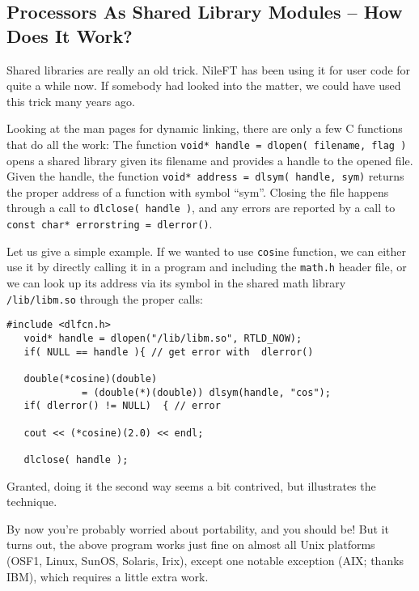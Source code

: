 \documentclass[12pt]{article}
\begin{document}
\begin{appendix}

\section{Processors As Shared Library Modules -- How Does It Work?
  }
\label{sec:SharedProcessors}

Shared libraries are really an old trick. NileFT has been using it for
user code for quite a while now. If somebody had looked into the matter,
we could have used this trick many years ago.

Looking at the man pages for dynamic linking, there are only a few C
functions that do all the work:
The function \texttt{void* handle = dlopen( filename, flag )} opens a
shared library given its filename and provides a handle to the opened file. 
Given the handle, the function \texttt{void* address = dlsym( handle,
sym)} returns the proper address of a function with symbol ``sym''.
Closing the file happens through a call to \texttt{dlclose( handle )},
and any errors are reported by a call to \texttt{const char* errorstring
= dlerror()}.

Let us give a simple example. If we wanted to use \texttt{cos}ine function,
we can either use it by directly calling it in a program and including the
\texttt{math.h} header file, or we can look up its address via its
symbol in the shared math library \texttt{/lib/libm.so} through the
proper calls:
%
\begin{verbatim}
#include <dlfcn.h>
   void* handle = dlopen("/lib/libm.so", RTLD_NOW);
   if( NULL == handle ){ // get error with  dlerror()

   double(*cosine)(double) 
             = (double(*)(double)) dlsym(handle, "cos");
   if( dlerror() != NULL)  { // error

   cout << (*cosine)(2.0) << endl;

   dlclose( handle );
\end{verbatim}
%
Granted, doing it the second way seems a bit contrived, but illustrates
the technique.

By now you're probably worried about portability, and you should be!
But it turns out, the above program works just fine on almost all Unix
platforms (OSF1, Linux, SunOS, Solaris, Irix), except one notable
exception (AIX; thanks IBM), which requires a little extra work.


\end{appendix}
\end{document}
